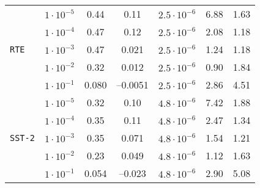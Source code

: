 \begin{table}[H]
\begin{tabular}{l c c c c c c}
\midrule
\multirow{5}{*}{\texttt{RTE}}
& \(1\cdot10^{-5}\) & 0.44 & 0.11   & \(2.5\cdot10^{-6}\) & 6.88 & 1.63 \\
& \(1\cdot10^{-4}\) & 0.47 & 0.12   & \(2.5\cdot10^{-6}\) & 2.08 & 1.18 \\
& \(1\cdot10^{-3}\) & 0.47 & 0.021  & \(2.5\cdot10^{-6}\) & 1.24 & 1.18 \\
& \(1\cdot10^{-2}\) & 0.32 & 0.012  & \(2.5\cdot10^{-6}\) & 0.90 & 1.84 \\
& \(1\cdot10^{-1}\) & 0.080 & –0.0051 & \(2.5\cdot10^{-6}\) & 2.86 & 4.51 \\

\midrule
\multirow{5}{*}{\texttt{SST-2}}
& \(1\cdot10^{-5}\) & 0.32 & 0.10   & \(4.8\cdot10^{-6}\) & 7.42 & 1.88 \\
& \(1\cdot10^{-4}\) & 0.35 & 0.11   & \(4.8\cdot10^{-6}\) & 2.47 & 1.34 \\
& \(1\cdot10^{-3}\) & 0.35 & 0.071  & \(4.8\cdot10^{-6}\) & 1.54 & 1.21 \\
& \(1\cdot10^{-2}\) & 0.23 & 0.049  & \(4.8\cdot10^{-6}\) & 1.12 & 1.63 \\
& \(1\cdot10^{-1}\) & 0.054 & –0.023 & \(4.8\cdot10^{-6}\) & 2.90 & 5.08 \\

\bottomrule
\end{tabular}
\end{table}